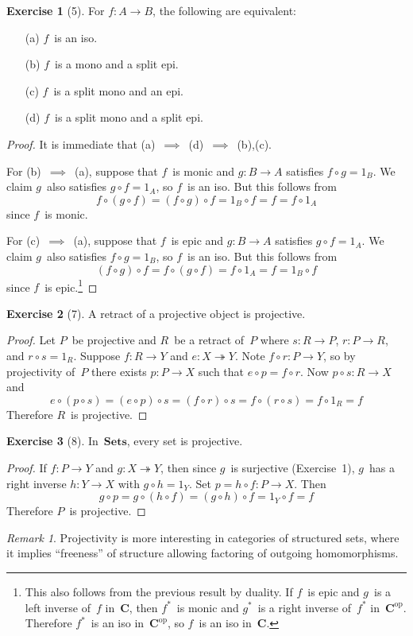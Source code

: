 \documentclass[letterpaper,12pt]{article}
\newcommand{\Sets}{\mathbf{Sets}}
\newcommand{\onto}{\twoheadrightarrow}
\newcommand{\after}{\circ}
\renewcommand{\star}[1]{#1^{*}}
\newcommand{\cat}[1]{\mathbf{#1}}
\newcommand{\dual}[1]{#1^{\mathrm{op}}}
\theoremstyle{definition}
\newtheorem*{exer}{Exercise}
\theoremstyle{remark}
\newtheorem*{rmk}{Remark}
\theoremstyle{direction}
\begin{document}
\begin{exer}[5]
For \(f:A\to B\), the following are equivalent:
\begin{enumerate}[itemsep=0pt]
\item[(a)] \(f\)~is an iso.
\item[(b)] \(f\)~is a mono and a split epi.
\item[(c)] \(f\)~is a split mono and an epi.
\item[(d)] \(f\)~is a split mono and a split epi.
\end{enumerate}
\begin{proof}
It is immediate that (a)~\(\implies\)~(d)~\(\implies\)~(b),(c).

For (b)~\(\implies\)~(a), suppose that \(f\)~is monic and \(g:B\to A\) satisfies \(f\after g=1_B\). We claim \(g\)~also satisfies \(g\after f=1_A\), so \(f\)~is an iso. But this follows from
\[f\after(g\after f)=(f\after g)\after f=1_B\after f=f=f\after 1_A\]
since \(f\)~is monic.

For (c)~\(\implies\)~(a), suppose that \(f\)~is epic and \(g:B\to A\) satisfies \(g\after f=1_A\). We claim \(g\)~also satisfies \(f\after g=1_B\), so \(f\)~is an iso. But this follows from
\[(f\after g)\after f=f\after(g\after f)=f\after 1_A=f=1_B\after f\]
since \(f\)~is epic.\footnote{This also follows from the previous result by duality. If \(f\)~is epic and \(g\)~is a left inverse of~\(f\) in~\(\cat{C}\), then \(\star{f}\)~is monic and \(\star{g}\)~is a right inverse of~\(\star{f}\) in~\(\dual{\cat{C}}\). Therefore \(\star{f}\)~is an iso in~\(\dual{\cat{C}}\), so \(f\)~is an iso in~\(\cat{C}\).} 
\end{proof}
\end{exer}

\begin{exer}[7]
A retract of a projective object is projective.
\end{exer}
\begin{proof}
Let \(P\)~be projective and \(R\)~be a retract of~\(P\) where \(s:R\to P\), \(r:P\to R\), and \(r\after s=1_R\). Suppose \(f:R\to Y\) and \(e:X\onto Y\). Note \(f\after r:P\to Y\), so by projectivity of~\(P\) there exists \(p:P\to X\) such that \(e\after p=f\after r\). Now \(p\after s:R\to X\) and
\[e\after(p\after s)=(e\after p)\after s=(f\after r)\after s=f\after(r\after s)=f\after 1_R=f\]
Therefore \(R\)~is projective.
\end{proof}

\begin{exer}[8]
In~\(\Sets\), every set is projective.
\end{exer}
\begin{proof}
If \(f:P\to Y\) and \(g:X\onto Y\), then since \(g\)~is surjective (Exercise~1), \(g\)~has a right inverse \(h:Y\to X\) with \(g\after h=1_Y\). Set \(p=h\after f:P\to X\). Then
\[g\after p=g\after(h\after f)=(g\after h)\after f=1_Y\after f=f\]
Therefore \(P\)~is projective. 
\end{proof}
\begin{rmk}
Projectivity is more interesting in categories of structured sets, where it implies ``freeness'' of structure allowing factoring of outgoing homomorphisms.
\end{rmk}
\end{document}
